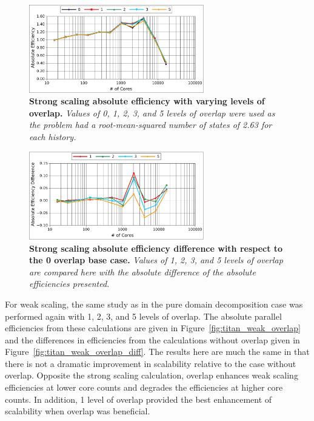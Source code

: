 \documentclass{snamc2013}
\begin{document}
\begin{figure}[h!]
  \begin{center}
    \includegraphics[width=3in]{titan_strong_overlap.pdf}
  \end{center}
  \caption{\textbf{Strong scaling absolute efficiency with varying
      levels of overlap.} \textit{Values of 0, 1, 2, 3, and 5 levels
      of overlap were used as the problem had a root-mean-squared
      number of states of 2.63 for each history.}}
  \label{fig:titan_strong_overlap}
\end{figure}

\begin{figure}[h!]
  \begin{center}
    \includegraphics[width=3in]{titan_strong_overlap_diff.pdf}
  \end{center}
  \caption{\textbf{Strong scaling absolute efficiency difference with
      respect to the 0 overlap base case.} \textit{Values of 1, 2, 3,
      and 5 levels of overlap are compared here with the absolute
      difference of the absolute efficiencies presented.}}
  \label{fig:titan_strong_overlap_diff}
\end{figure}

For weak scaling, the same study as in the pure domain decomposition
case was performed again with 1, 2, 3, and 5 levels of overlap. The
absolute parallel efficiencies from these calculations are given in
Figure~\ref{fig:titan_weak_overlap} and the differences in
efficiencies from the calculations without overlap given in
Figure~\ref{fig:titan_weak_overlap_diff}. The results here are much
the same in that there is not a dramatic improvement in scalability
relative to the case without overlap. Opposite the strong scaling
calculation, overlap enhances weak scaling efficiencies at lower core
counts and degrades the efficiencies at higher core counts. In
addition, 1 level of overlap provided the best enhancement of
scalability when overlap was beneficial.
\end{document}
